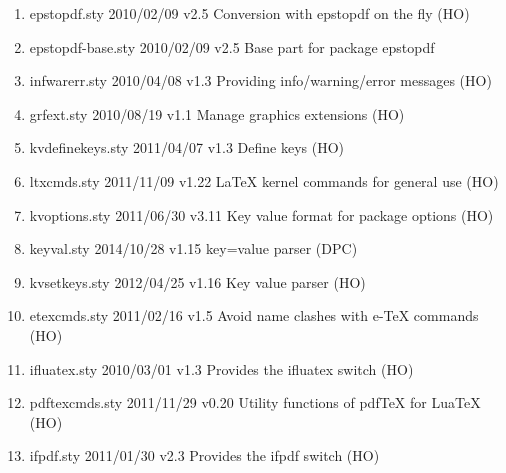 \begin{enumerate}
\item 	epstopdf.sty    2010/02/09 v2.5 Conversion with epstopdf on the fly (HO)
	\item epstopdf-base.sty 2010/02/09 v2.5 Base part for package epstopdf
	\item infwarerr.sty 2010/04/08 v1.3 Providing info/warning/error messages (HO)
	\item grfext.sty 2010/08/19 v1.1 Manage graphics extensions (HO)
	\item kvdefinekeys.sty 2011/04/07 v1.3 Define keys (HO)
	\item ltxcmds.sty 2011/11/09 v1.22 LaTeX kernel commands for general use (HO)
	\item kvoptions.sty 2011/06/30 v3.11 Key value format for package options (HO)
	\item keyval.sty 2014/10/28 v1.15 key=value parser (DPC)
	\item kvsetkeys.sty 2012/04/25 v1.16 Key value parser (HO)
	\item etexcmds.sty 2011/02/16 v1.5 Avoid name clashes with e-TeX commands (HO)
	\item ifluatex.sty 2010/03/01 v1.3 Provides the ifluatex switch (HO)
	\item pdftexcmds.sty 2011/11/29 v0.20 Utility functions of pdfTeX for LuaTeX (HO)
	\item ifpdf.sty 2011/01/30 v2.3 Provides the ifpdf switch (HO)
\end{enumerate} 

